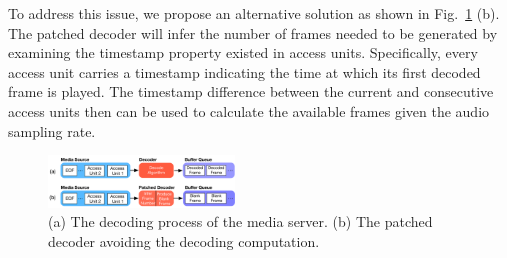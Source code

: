 \documentclass[conference]{IEEEtranl}
\begin{document}
	To address this issue, we propose an alternative solution  as shown in Fig.~\ref{fig:mediaserver} (b). The patched decoder will infer the number of frames needed to be generated by examining the timestamp property existed in access units. Specifically, every access unit carries a timestamp indicating the time at which its first decoded frame is played. The timestamp difference between the current and consecutive access units then can be used to calculate the available frames given the audio sampling rate. 

	\begin{figure}[tb]
	\begin{center}
	\includegraphics[width=0.44\textwidth]{Figures/mediaserver}
	\caption{(a) The decoding process of the media server. (b) The patched decoder avoiding the decoding computation.}
	\label{fig:mediaserver}
	\vspace{-0.3in}
	\end{center}
	\end{figure}




\end{document}
